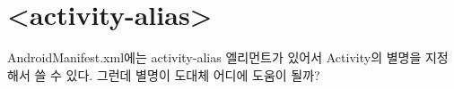 \section{<activity-alias>}\label{sec:alias}
AndroidManifest.xml에는 activity-alias 엘리먼트가 있어서 Activity의 별명을 지정해서 쓸 수 있다. 그런데 별명이 도대체 어디에 도움이 될까?

